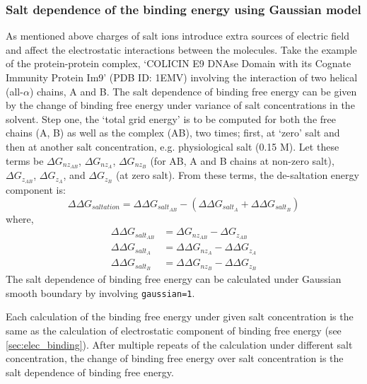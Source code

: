 \documentclass[9pt,tutorial]{livecoms}
\begin{document}
\subsubsection{Salt dependence of the binding energy using Gaussian model}
As mentioned above charges of salt ions introduce extra sources of electric field and affect the electrostatic interactions between the molecules.  Take the example of the protein-protein complex, `COLICIN E9 DNAse Domain with its Cognate Immunity Protein Im9' (PDB ID: 1EMV) involving the interaction of two helical (all-$ \alpha $) chains, A and B. The salt dependence of binding free energy can be given by the change of binding free energy under variance of salt concentrations in the solvent. Step one, the ‘total grid energy’ is to be computed for both the free chains (A, B) as well as the complex (AB), two times; first, at `zero' salt and then at another salt concentration, e.g. physiological salt (0.15 M). Let these terms be $ \Delta G_{nz_{AB}}$, $ \Delta G_{nz_A}$, $ \Delta G_{nz_B}$ (for AB, A and B chains at non-zero salt), $ \Delta G_{z_{AB}}$, $ \Delta G_{z_A} $, and $ \Delta G_{z_B}$ (at zero salt). From these terms, the de-saltation energy component is:
\begin{equation}
 \Delta\Delta G_{saltation}= \Delta\Delta G_{salt_{AB}}  - \left( \Delta\Delta G_{salt_A}  + \Delta\Delta G_{salt_B} \right)
\end{equation}
where,
\begin{equation}
\begin{aligned}
\Delta\Delta G_{salt_{AB}}  &= \Delta G_{nz_{AB}}  - \Delta G_{z_{AB}}
\nonumber \\
\Delta\Delta G_{salt_A}  &= \Delta\Delta G_{nz_A}  - \Delta\Delta G_{z_A} \nonumber \\
\Delta\Delta G_{salt_B}  &= \Delta\Delta G_{nz_B}  - \Delta\Delta G_{z_B} \nonumber
\end{aligned}
\end{equation}
The salt dependence of binding free energy can be calculated under Gaussian smooth boundary by involving \texttt{gaussian=1}\cite{jia2017treating}. 

Each calculation of the binding free energy under given salt concentration is the same as the calculation of electrostatic component of binding free energy (see \ref{sec:elec_binding}). After multiple repeats of the calculation under different salt concentration, the change of binding free energy over salt concentration is the salt dependence of binding free energy.
\end{document}
